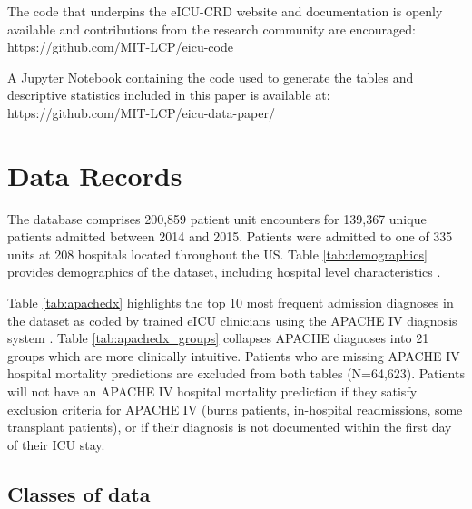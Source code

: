 \documentclass[english]{article}
\begin{document}

The code that underpins the eICU-CRD website and documentation is openly available and contributions from the research community are encouraged: \\ https://github.com/MIT-LCP/eicu-code

A Jupyter Notebook containing the code used to generate the tables and descriptive statistics included in this paper is available at: \\ https://github.com/MIT-LCP/eicu-data-paper/

\section*{Data Records}\label{data-records}

The database comprises 200,859 patient unit encounters for 139,367 unique
patients admitted between 2014 and 2015. Patients were admitted to one
of 335 units at 208 hospitals located throughout the US. Table \ref{tab:demographics} provides demographics of the dataset, including hospital level characteristics \cite{tableone}.

Table \ref{tab:apachedx} highlights the top 10 most frequent admission diagnoses in the dataset as coded by trained eICU clinicians using the APACHE IV
diagnosis system \cite{zimmerman2006acute}.
Table \ref{tab:apachedx_groups} collapses APACHE
diagnoses into 21 groups which are more clinically intuitive. Patients
who are missing APACHE IV hospital mortality predictions are excluded
from both tables (N=64,623). Patients will not have an APACHE IV
hospital mortality prediction if they satisfy exclusion criteria for
APACHE IV (burns patients, in-hospital readmissions, some transplant
patients), or if their diagnosis is not documented within the first day
of their ICU stay.

\subsection*{Classes of data}\label{classes-of-data}
\end{document}
